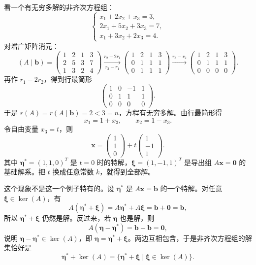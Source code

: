 看一个有无穷多解的非齐次方程组：
\[
\begin{cases}
x_1+2x_2+x_3=3,\\
2x_1+5x_2+3x_3=7,\\
x_1+3x_2+2x_3=4.
\end{cases}
\]
对增广矩阵消元：
\[
(A\mid \bm{b})=
\left(\begin{array}{ccc|c}
1&2&1&3\\
2&5&3&7\\
1&3&2&4
\end{array}\right)
\xrightarrow[r_3-r_1]{r_2-2r_1}
\left(\begin{array}{ccc|c}
1&2&1&3\\
0&1&1&1\\
0&1&1&1
\end{array}\right)
\xrightarrow{r_3-r_2}
\left(\begin{array}{ccc|c}
1&2&1&3\\
0&1&1&1\\
0&0&0&0
\end{array}\right).
\]
再作 \(r_1-2r_2\)，得到行最简形
\[
\left(\begin{array}{ccc|c}
1&0&-1&1\\
0&1&1&1\\
0&0&0&0
\end{array}\right).
\]
于是 \(r(A)=r(A\mid \bm{b})=2<3=n\)，方程有无穷多解。由行最简形得
\[
x_1=1+x_3,\qquad x_2=1-x_3.
\]
令自由变量 \(x_3=t\)，则
\[
\bm{x}=\begin{pmatrix}1\\1\\0\end{pmatrix}+t\begin{pmatrix}1\\-1\\1\end{pmatrix}.
\]
其中 \(\bm{\eta}^*=(1,1,0)^T\) 是 \(t=0\) 时的特解，\(\bm{\xi}=(1,-1,1)^T\) 是导出组 \(A\bm{x}=\bm{0}\) 的基础解系。把 \(t\) 换成任意常数 \(k\)，就得到全部解。

这个现象不是这一个例子特有的。设 \(\bm{\eta}^*\) 是 \(A\bm{x}=\bm{b}\) 的一个特解。对任意 \(\bm{\xi}\in\ker(A)\)，有
\[
A(\bm{\eta}^*+\bm{\xi})=A\bm{\eta}^*+A\bm{\xi}=\bm{b}+\bm{0}=\bm{b},
\]
所以 \(\bm{\eta}^*+\bm{\xi}\) 仍然是解。反过来，若 \(\bm{\eta}\) 也是解，则
\[
A(\bm{\eta}-\bm{\eta}^*)=\bm{b}-\bm{b}=\bm{0},
\]
说明 \(\bm{\eta}-\bm{\eta}^*\in\ker(A)\)，即 \(\bm{\eta}=\bm{\eta}^*+\bm{\xi}\)。两边互相包含，于是非齐次方程组的解集恰好是
\[
\bm{\eta}^*+\ker(A)=\{\bm{\eta}^*+\bm{\xi}\mid \bm{\xi}\in\ker(A)\}.
\]

